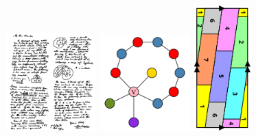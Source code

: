 \documentclass[11pt,a4paper,twoside]{book}
\begin{document}
\vspace{5.7cm}
	\begin{figure}[htbp]
	\centering
	\begin{minipage}{0.35\textwidth}
		\centering
		\includegraphics[width=3.5cm]{myimages/pic2.png}
	\end{minipage}
	\hspace{-0.5cm}
	\begin{minipage}{0.25\textwidth}
		\centering
		\includegraphics[width=3.5cm]{myimages/pic3.png}
	\end{minipage}
	\hspace{-0.5cm}
	\begin{minipage}{0.35\textwidth}
		\centering
		\includegraphics[width=2.2cm]{myimages/pic4.png}
	\end{minipage}
\end{figure}
\end{document}
